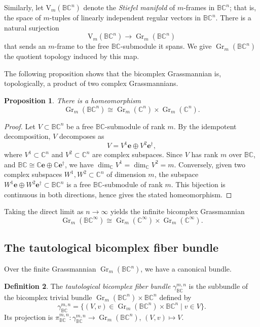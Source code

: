 \documentclass[11pt]{amsart}
\newcommand{\BC}{\mathbb{BC}}       %
\newcommand{\C}{\mathbb{C}}          %
\newcommand{\e}{\mathbf{e}}          %
\newcommand{\ed}{\mathbf{e}^\dagger} %
\newcommand{\Gr}{\operatorname{Gr}}
\newtheorem{prop}{Proposition}[section]   %
\theoremstyle{definition}
\newtheorem{defn}[prop]{Definition}       %
\begin{document}
Similarly, let $\mathrm{V}_m(\BC^n)$ denote the \emph{Stiefel manifold} of $m$-frames in $\BC^n$; that is, the space of $m$-tuples of linearly independent regular vectors in $\BC^n$. There is a natural surjection
\begin{equation*}
    \mathrm{V}_m(\BC^n) \to \Gr_m(\BC^n)
\end{equation*}
that sends an $m$-frame to the free $\BC$-submodule it spans. We give $\Gr_m(\BC^n)$ the quotient topology induced by this map.

The following proposition shows that the bicomplex Grassmannian is, topologically, a product of two complex Grassmannians.

\begin{prop}
    There is a homeomorphism
    \begin{equation*}
        \Gr_m(\BC^n) \cong \Gr_m(\C^n) \times \Gr_m(\C^n).
    \end{equation*}
\end{prop}

\begin{proof}
    Let $V \subset \BC^n$ be a free $\BC$-submodule of rank $m$. By the idempotent decomposition, $V$ decomposes as
    \begin{equation*}
        V = V^1\e \oplus V^2\ed,
    \end{equation*}
    where $V^1 \subset \C^n$ and $V^2 \subset \C^n$ are complex subspaces. Since $V$ has rank $m$ over $\BC$, and $\BC \cong \C\e \oplus \C\ed$, we have $\dim_\C V^1 = \dim_\C V^2 = m$. Conversely, given two complex subspaces $W^1, W^2 \subset \C^n$ of dimension $m$, the subspace $W^1\e \oplus W^2\ed \subset \BC^n$ is a free $\BC$-submodule of rank $m$. This bijection is continuous in both directions, hence gives the stated homeomorphism.
\end{proof}

Taking the direct limit as $n \to \infty$ yields the infinite bicomplex Grassmannian
\begin{equation*}
    \Gr_m(\BC^\infty) \cong \Gr_m(\C^\infty) \times \Gr_m(\C^\infty).
\end{equation*}

\subsection{The tautological bicomplex fiber bundle}

Over the finite Grassmannian $\Gr_m(\BC^n)$, we have a canonical bundle.

\begin{defn}
    The \emph{tautological bicomplex fiber bundle} $\gamma_{\BC}^{m,n}$ is the subbundle of the bicomplex trivial bundle $\Gr_m(\BC^n) \times \BC^n$ defined by
    \begin{equation*}
        \gamma_{\BC}^{m,n} = \bigl\{ (V, v) \in \Gr_m(\BC^n) \times \BC^n \mid v \in V \bigr\}.
    \end{equation*}
    Its projection is $\pi_{\BC}^{m,n} : \gamma_{\BC}^{m,n} \to \Gr_m(\BC^n)$, $(V,v) \mapsto V$.
\end{defn}
\end{document}
